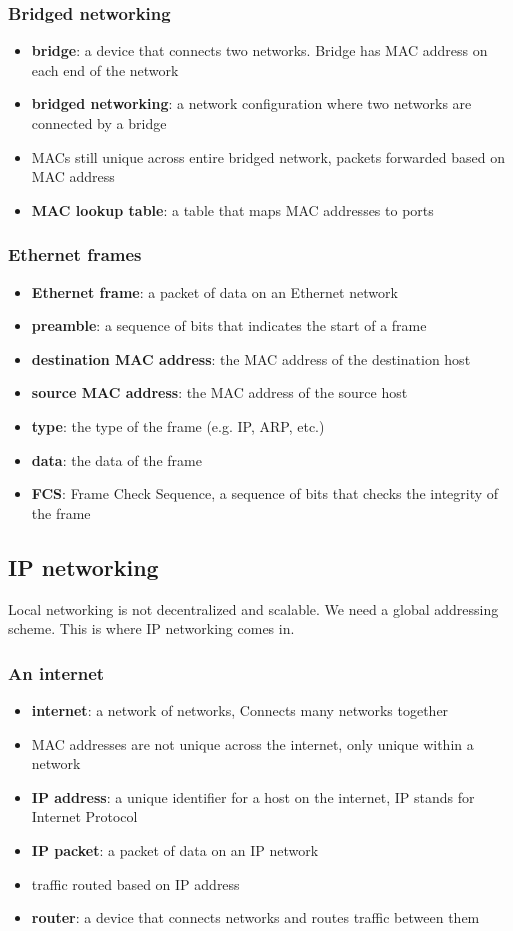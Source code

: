 \documentclass[letterpaper,12pt]{article}
\begin{document}
\subsubsection{Bridged networking}
\begin{itemize}
    \item \textbf{bridge}: a device that connects two networks. Bridge has MAC address on each end of the network
    \item \textbf{bridged networking}: a network configuration where two networks are connected by a bridge
    \item MACs still unique across entire bridged network, packets forwarded based on MAC address
    \item \textbf{MAC lookup table}: a table that maps MAC addresses to ports
\end{itemize}
\subsubsection{Ethernet frames}
\begin{itemize}
    \item \textbf{Ethernet frame}: a packet of data on an Ethernet network
    \item \textbf{preamble}: a sequence of bits that indicates the start of a frame
    \item \textbf{destination MAC address}: the MAC address of the destination host
    \item \textbf{source MAC address}: the MAC address of the source host
    \item \textbf{type}: the type of the frame (e.g. IP, ARP, etc.)
    \item \textbf{data}: the data of the frame
    \item \textbf{FCS}: Frame Check Sequence, a sequence of bits that checks the integrity of the frame
\end{itemize}
\subsection{IP networking}
Local networking is not decentralized and scalable. We need a global addressing scheme. This is where IP networking comes in.
\subsubsection{An internet}
\begin{itemize}
    \item \textbf{internet}: a network of networks, Connects many networks together
    \item MAC addresses are not unique across the internet, only unique within a network
    \item \textbf{IP address}: a unique identifier for a host on the internet, IP stands for Internet Protocol
    \item \textbf{IP packet}: a packet of data on an IP network
    \item traffic routed based on IP address
    \item \textbf{router}: a device that connects networks and routes traffic between them
\end{itemize}
\end{document}
